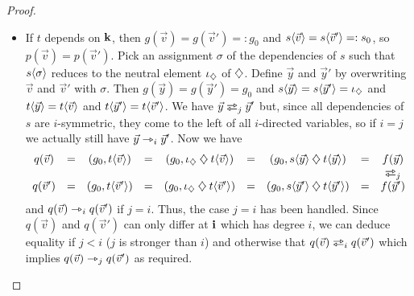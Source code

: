 \documentclass[a4paper]{memoir}
\begin{document}
\begin{proof}
\begin{itemize}
\begin{itemize}
\begin{itemize}
\begin{itemize}
					\item If $t$ depends on $\mathbf{k}$, then $g(\vec v) = g(\vec v') =: g_0$ and $s \langle \vec v \rangle = s \langle \vec v' \rangle =: s_0$, so $p(\vec v) = p(\vec v')$.
					Pick an assignment $\sigma$ of the dependencies of $s$ such that $s \langle \sigma \rangle$ reduces to the neutral element $\iota_{\mathbin{\diamondsuit}}$ of $\mathbin{\diamondsuit}$.
					Define $\vec y$ and $\vec y'$ by overwriting $\vec v$ and $\vec v'$ with $\sigma$.
					Then $g(\vec y) = g(\vec y') = g_0$ and $s \langle \vec y \rangle = s \langle \vec y' \rangle = \iota_{\mathbin{\diamondsuit}}$ and $t \langle \vec y \rangle = t \langle \vec v \rangle$ and $t \langle \vec y' \rangle = t \langle \vec v' \rangle$.
					We have $\vec y \infrajet_j \vec y'$ but, since all dependencies of $s$ are $i$-symmetric, they come to the left of all $i$-directed variables, so if $i = j$ we actually still have $\vec y \rightarrowtriangle_i \vec y'$.
					Now we have
					\[
						\begin{array}{c c c c c c c c c}
						q(\vec v)
						&=& (g_0, t \psub{\vec v})
						&=& (g_0, \neutralA \opA t \psub{\vec v})
						&=& (g_0, s \psub{\vec y} \opA t \psub{\vec y})
						&=& f(\vec y)
						\\
						&&&&&&&& \infrajet_j
						\\
						q(\vec v')
						&=& (g_0, t \psub{\vec v'})
						&=& (g_0, \neutralA \opA t \psub{\vec v'})
						&=& (g_0, s \psub{\vec y'} \opA t \psub{\vec y'})
						&=& f(\vec y')
						\end{array}
					\]
					and $q(\vec v) \rightarrowtriangle_i q(\vec v')$ if $j = i$.
					Thus, the case $j = i$ has been handled.
					Since $q(\vec v)$ and $q(\vec v')$ can only differ at $\mathbf{i}$ which has degree $i$, we can deduce equality if $j < i$ ($j$ is stronger than $i$) and otherwise that $q(\vec v) \infrajet_i q(\vec v')$ which implies $q(\vec v) \rightarrowtriangle_j q(\vec v')$ as required. \qedhere
				\end{itemize}
			\end{itemize}
		\end{itemize}
	\end{itemize}
\end{proof}
\end{document}
